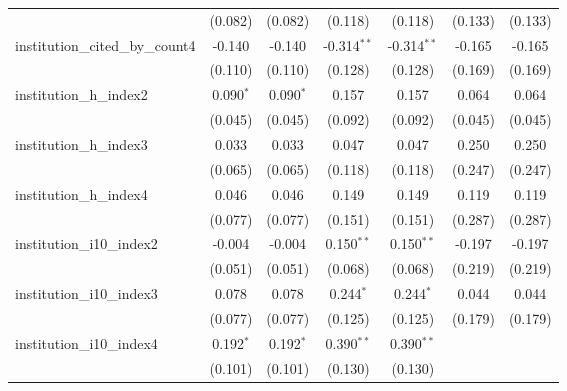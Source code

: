 \begin{tabular}{lcccccc}
                                         & (0.082)        & (0.082)        & (0.118)       & (0.118)       & (0.133)        & (0.133)\\   
   institution\_cited\_by\_count4        & -0.140         & -0.140         & -0.314$^{**}$ & -0.314$^{**}$ & -0.165         & -0.165\\   
                                         & (0.110)        & (0.110)        & (0.128)       & (0.128)       & (0.169)        & (0.169)\\   
   institution\_h\_index2                & 0.090$^{*}$    & 0.090$^{*}$    & 0.157         & 0.157         & 0.064          & 0.064\\   
                                         & (0.045)        & (0.045)        & (0.092)       & (0.092)       & (0.045)        & (0.045)\\   
   institution\_h\_index3                & 0.033          & 0.033          & 0.047         & 0.047         & 0.250          & 0.250\\   
                                         & (0.065)        & (0.065)        & (0.118)       & (0.118)       & (0.247)        & (0.247)\\   
   institution\_h\_index4                & 0.046          & 0.046          & 0.149         & 0.149         & 0.119          & 0.119\\   
                                         & (0.077)        & (0.077)        & (0.151)       & (0.151)       & (0.287)        & (0.287)\\   
   institution\_i10\_index2              & -0.004         & -0.004         & 0.150$^{**}$  & 0.150$^{**}$  & -0.197         & -0.197\\   
                                         & (0.051)        & (0.051)        & (0.068)       & (0.068)       & (0.219)        & (0.219)\\   
   institution\_i10\_index3              & 0.078          & 0.078          & 0.244$^{*}$   & 0.244$^{*}$   & 0.044          & 0.044\\   
                                         & (0.077)        & (0.077)        & (0.125)       & (0.125)       & (0.179)        & (0.179)\\   
   institution\_i10\_index4              & 0.192$^{*}$    & 0.192$^{*}$    & 0.390$^{**}$  & 0.390$^{**}$  &                &   \\   
                                         & (0.101)        & (0.101)        & (0.130)       & (0.130)       &                &   \\   

\end{tabular}
